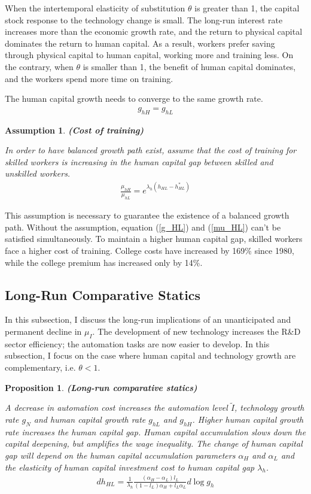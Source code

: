 \documentclass[12pt]{article}
\newtheorem{assumption}{Assumption}
\newtheorem{proposition}{Proposition}
\begin{document}
When the intertemporal elasticity of substitution $\theta$ is greater than 1, the capital stock response to the technology change is small. The long-run interest rate increases more than the economic growth rate, and the return to physical capital dominates the return to human capital. As a result, workers prefer saving through physical capital to human capital, working more and training less. On the contrary, when $\theta$ is smaller than 1, the benefit of human capital dominates, and the workers spend more time on training. 

The human capital growth needs to converge to the same growth rate. 
\begin{align}
\label{g_HL}
g_{hH} = g_{hL}
\end{align}

\begin{assumption}{\bf (Cost of training)}

In order to have balanced growth path exist, assume that the cost of training for skilled workers is increasing in the human capital gap between skilled and unskilled workers. 
\begin{align}
\label{mu_HL}
\frac{\mu_{hH}}{\mu_{hL}} = e^{\lambda_h(h_{HL}-h_{HL}^*)}
\end{align}
\end{assumption}

This assumption is necessary to guarantee the existence of a balanced growth path. Without the assumption, equation (\ref{g_HL}) and (\ref{mu_HL}) can't be satisfied simultaneously. To maintain a higher human capital gap, skilled workers face a higher cost of training. College costs have increased by 169\% since 1980, while the college premium has increased only by 14\%.\cite{Sourse: CNBC}


\subsection{Long-Run Comparative Statics}
In this subsection, I discuss the long-run implications of an unanticipated and permanent decline in $\mu_I$. The development of new technology increases the R\&D sector efficiency; the automation tasks are now easier to develop. In this subsection, I focus on the case where human capital and technology growth are complementary, i.e. $\theta<1$. 

\begin{proposition}{\bf (Long-run comparative statics)} 

A decrease in automation cost increases the automation level $\tilde{I}$, technology growth rate $g_N$ and human capital growth rate $g_{hL}$ and $g_{hH}$. Higher human capital growth rate increases the human capital gap. Human capital accumulation slows down the capital deepening, but amplifies the wage inequality. The change of human capital gap will depend on the human capital accumulation parameters $\alpha_H$ and $\alpha_L$ and the elasticity of human capital investment cost to human capital gap $\lambda_h$. 
\begin{align*}
dh_{HL} = \frac{1}{\lambda_h}\frac{(\alpha_H-\alpha_L)l_L}{(1-l_L)\alpha_H+l_L\alpha_L}d\log g_h
\end{align*}
\end{proposition}
\end{document}
